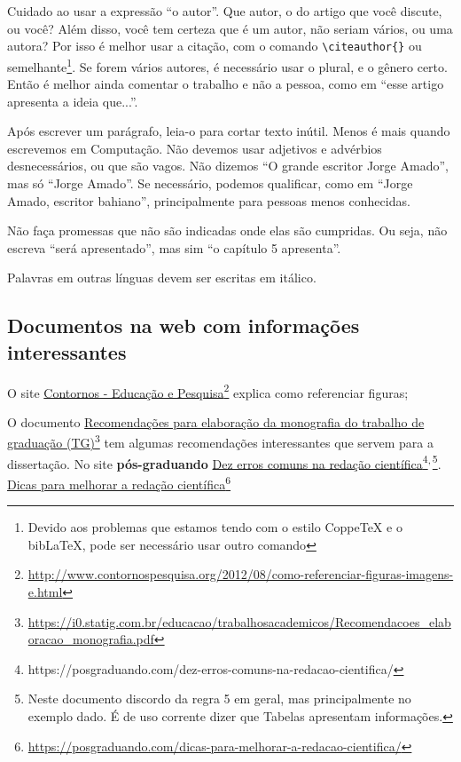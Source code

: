 \documentclass{article}
\begin{document}
\begin{outline}
Cuidado ao usar a expressão ``o autor''. Que autor, o do artigo que você discute, ou você? Além disso, você tem certeza que é um autor, não seriam vários, ou uma autora? Por isso é melhor usar a citação, com o comando \verb!\citeauthor{}! ou semelhante\footnote{Devido aos problemas que estamos tendo com o estilo CoppeTeX e o bib\LaTeX, pode ser necessário usar outro comando}. Se forem vários autores, é necessário usar o plural, e o gênero certo. Então é melhor ainda comentar o trabalho e não a pessoa, como em ``esse artigo apresenta a ideia que...''.

Após escrever um parágrafo, leia-o para cortar texto inútil. Menos é mais quando escrevemos em Computação. Não devemos usar adjetivos e advérbios desnecessários, ou que são vagos. Não dizemos ``O grande escritor Jorge Amado'', mas só ``Jorge Amado''. Se necessário, podemos qualificar, como em ``Jorge Amado, escritor bahiano'', principalmente para pessoas menos conhecidas.

 Não faça promessas que não são indicadas onde elas são cumpridas. Ou seja, não escreva ``será apresentado'', mas sim ``o capítulo 5 apresenta''.

Palavras em outras línguas devem ser escritas em itálico.


\subsection{Documentos na web com informações interessantes}

\begin{outline}
\1 O site \href{http://www.contornospesquisa.org/2012/08/como-referenciar-figuras-imagens-e.html}{Contornos - Educação e Pesquisa}\footnote{\url{http://www.contornospesquisa.org/2012/08/como-referenciar-figuras-imagens-e.html}} explica como referenciar figuras;

\1 O documento \href{https://i0.statig.com.br/educacao/trabalhosacademicos/Recomendacoes_elaboracao_monografia.pdf}{Recomendações para elaboração da monografia do trabalho de graduação (TG)}\footnote{\url{https://i0.statig.com.br/educacao/trabalhosacademicos/Recomendacoes_elaboracao_monografia.pdf}} tem algumas recomendações interessantes que servem para a dissertação.
\1 No site \textbf{pós-graduando}
\2 \href{https://posgraduando.com/dez-erros-comuns-na-redacao-cientifica/}{Dez erros comuns na redação científica}\footnote{https://posgraduando.com/dez-erros-comuns-na-redacao-cientifica/}\textsuperscript{,\,}\footnote{Neste documento discordo da regra 5 em geral, mas principalmente no exemplo dado. É de uso corrente dizer que Tabelas apresentam informações.}. 
\2 \href{https://posgraduando.com/dicas-para-melhorar-a-redacao-cientifica/}{Dicas para melhorar a redação científica}\footnote{\url{https://posgraduando.com/dicas-para-melhorar-a-redacao-cientifica/}}
\end{outline}


\end{outline}
\end{document}
